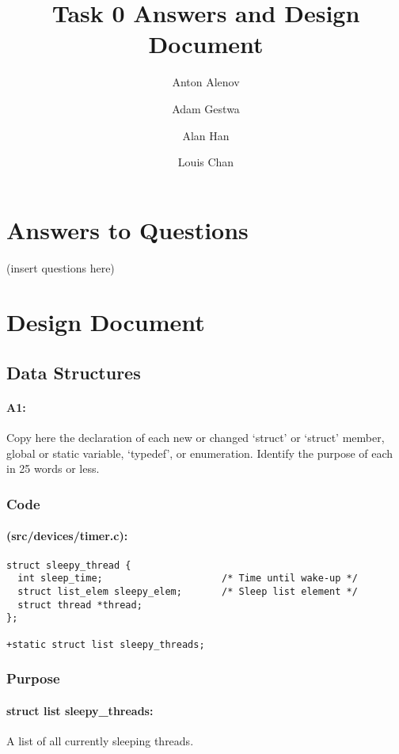 \documentclass[11pt]{article}
\begin{document}
\title{Task 0 Answers and Design Document}
\author{Anton Alenov \and Adam Gestwa \and Alan Han \and Louis Chan}

\maketitle

\section{Answers to Questions}
(insert questions here)

\section{Design Document}

\subsection{Data Structures}
\paragraph{A1:}
Copy here the declaration of each new or changed ‘struct’ or ‘struct’ member, global or static variable, ‘typedef’, or enumeration. Identify the purpose of each in 25 words or less.
\subsubsection{Code}

\paragraph{(src/devices/timer.c):}

\begin{verbatim}
struct sleepy_thread {
  int sleep_time;                     /* Time until wake-up */
  struct list_elem sleepy_elem;       /* Sleep list element */
  struct thread *thread;
};

+static struct list sleepy_threads;
\end{verbatim}

\subsubsection{Purpose}
\paragraph{struct list sleepy\_threads:}
A list of all currently sleeping threads.
\end{document}

